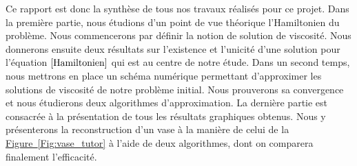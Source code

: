 Ce rapport est donc la synthèse de tous nos travaux réalisés pour ce projet. Dans la première partie, nous étudions d'un point de vue théorique l'Hamiltonien du problème. Nous commencerons par définir la notion de solution de viscosité. Nous donnerons ensuite deux résultats sur l'existence et l'unicité d'une solution pour l'équation $\eqref{Hamiltonien}$ qui est au centre de notre étude. Dans un second temps, nous mettrons en place un schéma numérique permettant d'approximer les solutions de viscosité de notre problème initial. Nous prouverons sa convergence et nous étudierons deux algorithmes d'approximation. La dernière partie est consacrée à la présentation de tous les résultats graphiques obtenus. Nous y présenterons la reconstruction d'un vase à la manière de celui de la \hyperref[Fig:vase_tutor]{Figure~\ref*{Fig:vase_tutor}} à l'aide de deux algorithmes, dont on comparera finalement l'efficacité.



